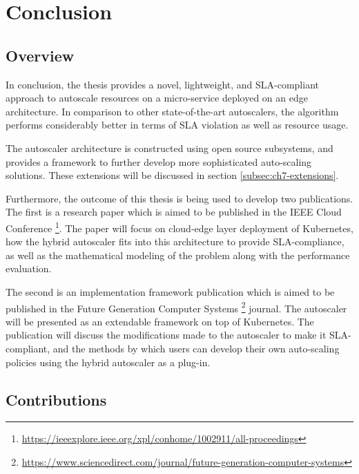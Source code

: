 \clearpage

\def\chaptertitle{Conclusion}

\lhead{\emph{\chaptertitle}}

\chapter{\chaptertitle}
\label{ch:conclusion}

\section{Overview}
\label{sec:ch7-overview}

In conclusion, the thesis provides a novel, lightweight, and SLA-compliant approach to autoscale resources on a micro-service deployed on an edge architecture. In comparison to other state-of-the-art autoscalers, the algorithm performs considerably better in terms of SLA violation as well as resource usage.\par

The autoscaler architecture is constructed using open source subsystems, and provides a framework to further develop more sophisticated auto-scaling solutions. These extensions will be discussed in section \ref{subsec:ch7-extensions}.\par

Furthermore, the outcome of this thesis is being used to develop two publications. The first is a research paper which is aimed to be published in the IEEE Cloud Conference \footnote{\url{https://ieeexplore.ieee.org/xpl/conhome/1002911/all-proceedings}}. The paper will focus on cloud-edge layer deployment of Kubernetes, how the hybrid autoscaler fits into this architecture to provide SLA-compliance, as well as the mathematical modeling of the problem along with the performance evaluation.\par

The second is an implementation framework publication which is aimed to be published in the Future Generation Computer Systems \footnote{\url{https://www.sciencedirect.com/journal/future-generation-computer-systems}} journal. The autoscaler will be presented as an extendable framework on top of Kubernetes. The publication will discuss the modifications made to the autoscaler to make it SLA-compliant, and the methods by which users can develop their own auto-scaling policies using the hybrid autoscaler as a plug-in.\par

\section{Contributions}
\label{sec:ch7-contribution}

